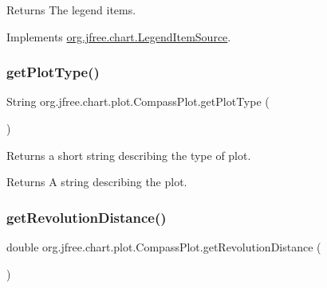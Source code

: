 \begin{DoxyReturn}{Returns}
The legend items. 
\end{DoxyReturn}


Implements \mbox{\hyperlink{interfaceorg_1_1jfree_1_1chart_1_1_legend_item_source_a224409463c4f7a8ef0e2a9df337e6d3b}{org.\+jfree.\+chart.\+Legend\+Item\+Source}}.

\mbox{\label{classorg_1_1jfree_1_1chart_1_1plot_1_1_compass_plot_a8e718349345edda7a589aac440b40d88}} 
\subsubsection{\texorpdfstring{get\+Plot\+Type()}{getPlotType()}}
{\footnotesize\ttfamily String org.\+jfree.\+chart.\+plot.\+Compass\+Plot.\+get\+Plot\+Type (\begin{DoxyParamCaption}{ }\end{DoxyParamCaption})}

Returns a short string describing the type of plot.

\begin{DoxyReturn}{Returns}
A string describing the plot. 
\end{DoxyReturn}
\mbox{\label{classorg_1_1jfree_1_1chart_1_1plot_1_1_compass_plot_a2ef264b10a5113a67d757d908a2f4d68}} 
\subsubsection{\texorpdfstring{get\+Revolution\+Distance()}{getRevolutionDistance()}}
{\footnotesize\ttfamily double org.\+jfree.\+chart.\+plot.\+Compass\+Plot.\+get\+Revolution\+Distance (\begin{DoxyParamCaption}{ }\end{DoxyParamCaption})}

